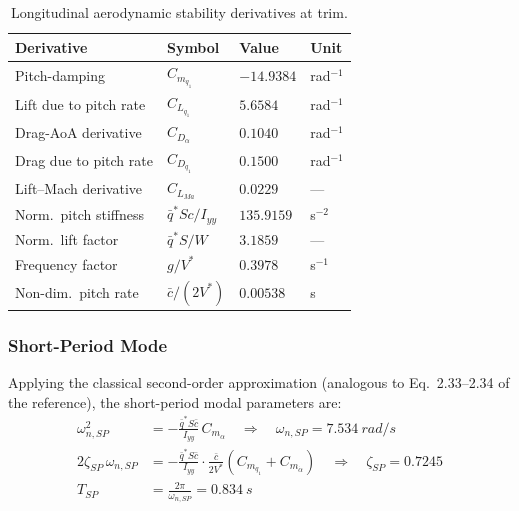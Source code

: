 \begin{table}[H]
  \centering
  \caption{Longitudinal aerodynamic stability derivatives at trim.}
  \label{tab:long_derivs}
  \begin{tabular}{llll}
    \toprule
    \textbf{Derivative} & \textbf{Symbol} & \textbf{Value} & \textbf{Unit} \\
    \midrule
    Pitch-damping          & $C_{m_{q_1}}$              & $-14.9384$  & rad$^{-1}$ \\
    Lift due to pitch rate & $C_{L_{q_1}}$              & $5.6584$    & rad$^{-1}$ \\
    Drag-AoA derivative    & $C_{D_\alpha}$             & $0.1040$    & rad$^{-1}$ \\
    Drag due to pitch rate & $C_{D_{q_1}}$              & $0.1500$    & rad$^{-1}$ \\
    Lift–Mach derivative   & $C_{L_{Ma}}$               & $0.0229$    & ---        \\
    Norm.\ pitch stiffness & $\bar{q}^*Sc/I_{yy}$       & $135.9159$  & s$^{-2}$   \\
    Norm.\ lift factor     & $\bar{q}^*S/W$             & $3.1859$    & ---        \\
    Frequency factor       & $g/V^*$                    & $0.3978$    & s$^{-1}$   \\
    Non-dim.\ pitch rate   & $\bar{c}/(2V^*)$           & $0.00538$   & s          \\
    \bottomrule
  \end{tabular}
\end{table}

\subsubsection{Short-Period Mode}

Applying the classical second-order approximation (analogous to Eq.~2.33--2.34 of the reference), the short-period modal parameters are:
\begin{align}
  \omega_{n,SP}^2 &= -\frac{\bar{q}^*S\bar{c}}{I_{yy}}\,C_{m_\alpha}
  \quad\Rightarrow\quad \omega_{n,SP} = \SI{7.534}{rad/s} \\[4pt]
  2\zeta_{SP}\,\omega_{n,SP} &= -\frac{\bar{q}^*S\bar{c}}{I_{yy}}\cdot
     \frac{\bar{c}}{2V^*}\!\left(C_{m_{q_1}}+C_{m_{\dot\alpha}}\right)
  \quad\Rightarrow\quad \zeta_{SP} = 0.7245 \\[4pt]
  T_{SP} &= \frac{2\pi}{\omega_{n,SP}} = \SI{0.834}{s}
\end{align}

